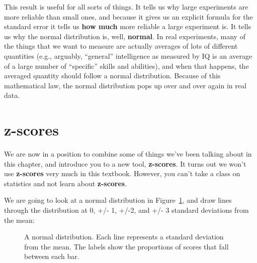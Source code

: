 \documentclass[
  letterpaper,
  DIV=11,
  numbers=noendperiod]{scrreprt}
\begin{document}
This result is useful for all sorts of things. It tells us why large
experiments are more reliable than small ones, and because it gives us
an explicit formula for the standard error it tells us \textbf{how much}
more reliable a large experiment is. It tells us why the normal
distribution is, well, \textbf{normal}. In real experiments, many of the
things that we want to measure are actually averages of lots of
different quantities (e.g., arguably, ``general'' intelligence as
measured by IQ is an average of a large number of ``specific'' skills
and abilities), and when that happens, the averaged quantity should
follow a normal distribution. Because of this mathematical law, the
normal distribution pops up over and over again in real data.

\section{z-scores}\label{z-scores}

We are now in a position to combine some of things we've been talking
about in this chapter, and introduce you to a new tool,
\textbf{z-scores}. It turns out we won't use \textbf{z-scores} very much
in this textbook. However, you can't take a class on statistics and not
learn about \textbf{z-scores}.

We are going to look at a normal distribution in
Figure~\ref{fig-4normalSDspercents}, and draw lines through the
distribution at 0, +/- 1, +/-2, and +/- 3 standard deviations from the
mean:

\begin{figure}


\caption{\label{fig-4normalSDspercents}A normal distribution. Each line
represents a standard deviation from the mean. The labels show the
proportions of scores that fall between each bar.}

\end{figure}%
\end{document}
